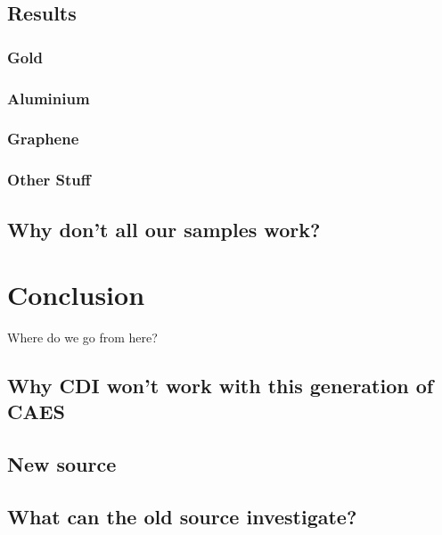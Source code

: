 \section{Results}

\subsection{Gold}

\subsection{Aluminium}

\subsection{Graphene}

\subsection{Other Stuff}

\section{Why don't all our samples work?}





\chapter{Conclusion}

Where do we go from here?

\section{Why CDI won't work with this generation of CAES}

\section{New source}

\section{What can the old source investigate?}


